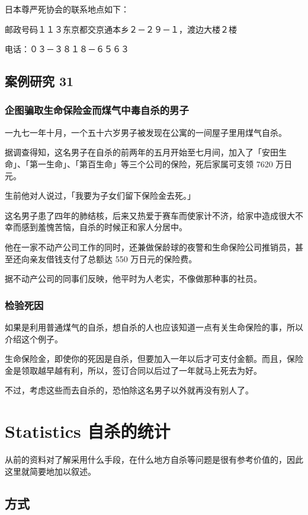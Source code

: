 \documentclass[UTF8]{ctexart}
\begin{document}
日本尊严死协会的联系地点如下：

邮政号码１１３东京都交京通本乡２－２９－１，渡边大楼２楼

电话：０３－３８１８－６５６３


\subsection{案例研究 31}

\subsubsection*{企图骗取生命保险金而煤气中毒自杀的男子}

一九七一年十月，一个五十六岁男子被发现在公寓的一间屋子里用煤气自杀。

据调查得知，这名男子在自杀的前两年的五月开始至七月间，加入了「安田生命」、「第一生命」、「第百生命」等三个公司的保险，死后家属可支领 7620 万日元。

生前他对人说过，「我要为子女们留下保险金去死。」

这名男子患了四年的肺结核，后来又热爱于赛车而使家计不济，给家中造成很大不幸而感到羞愧苦恼，自杀的时候正和家人分居中。

他在一家不动产公司工作的同时，还兼做保龄球的夜警和生命保险公司推销员，甚至还向亲友借钱支付了总额达 550 万日元的保险费。

据不动产公司的同事们反映，他平时为人老实，不像做那种事的社员。

\subsubsection*{检验死因}

如果是利用普通煤气的自杀，想自杀的人也应该知道一点有关生命保险的事，所以介绍这个例子。

生命保险金，即使你的死因是自杀，但要加入一年以后才可支付金额。而且，保险金是领取越早越有利，所以，签订合同以后过了一年就马上死去为好。

不过，考虑这些而去自杀的，恐怕除这名男子以外就再没有别人了。


\newpage

\section{Statistics 自杀的统计}

从前的资料对了解采用什么手段，在什么地方自杀等问题是很有参考价值的，因此这里就简要地加以叙述。
\subsection{方式}
\end{document}
